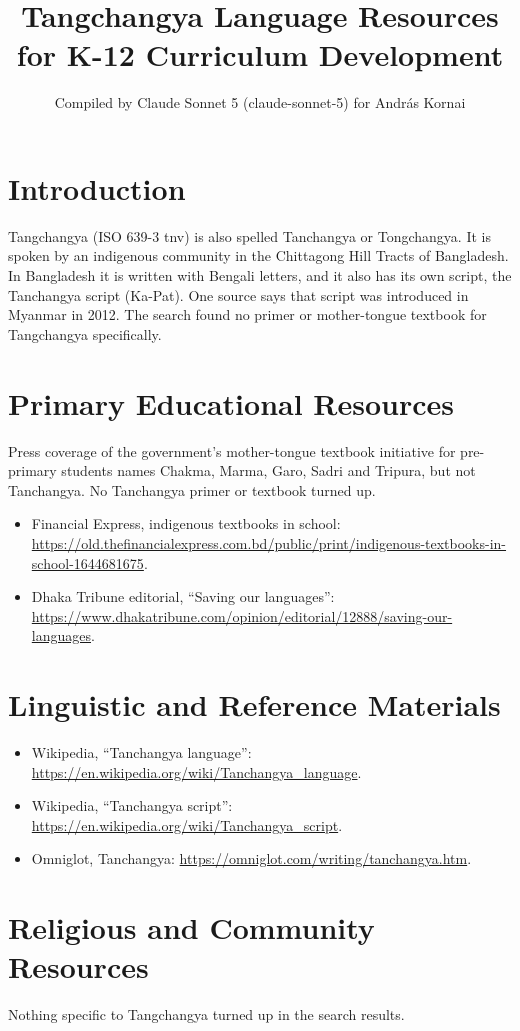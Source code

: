 \documentclass[12pt]{article}
\title{Tangchangya Language Resources for K-12 Curriculum Development}
\author{Compiled by Claude Sonnet 5 (claude-sonnet-5) for Andr\'as Kornai}
\date{}
\begin{document}
\maketitle

\section{Introduction}
Tangchangya (ISO 639-3 tnv) is also spelled Tanchangya or Tongchangya. It is spoken by an indigenous community in the Chittagong Hill Tracts of Bangladesh. In Bangladesh it is written with Bengali letters, and it also has its own script, the Tanchangya script (Ka-Pat). One source says that script was introduced in Myanmar in 2012. The search found no primer or mother-tongue textbook for Tangchangya specifically.

\section{Primary Educational Resources}
Press coverage of the government's mother-tongue textbook initiative for pre-primary students names Chakma, Marma, Garo, Sadri and Tripura, but not Tanchangya. No Tanchangya primer or textbook turned up.
\begin{itemize}
\item Financial Express, indigenous textbooks in school: \url{https://old.thefinancialexpress.com.bd/public/print/indigenous-textbooks-in-school-1644681675}.
\item Dhaka Tribune editorial, ``Saving our languages'': \url{https://www.dhakatribune.com/opinion/editorial/12888/saving-our-languages}.
\end{itemize}

\section{Linguistic and Reference Materials}
\begin{itemize}
\item Wikipedia, ``Tanchangya language'': \url{https://en.wikipedia.org/wiki/Tanchangya_language}.
\item Wikipedia, ``Tanchangya script'': \url{https://en.wikipedia.org/wiki/Tanchangya_script}.
\item Omniglot, Tanchangya: \url{https://omniglot.com/writing/tanchangya.htm}.
\end{itemize}

\section{Religious and Community Resources}
Nothing specific to Tangchangya turned up in the search results.
\end{document}
